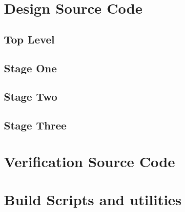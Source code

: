     \section{Design Source Code}
        \subsection{Top Level}
        
        
        \subsection{Stage One}
        
        
        
        
        
        
        
        \subsection{Stage Two}
        
        
        
        
        
        
        
        
        
        
        \subsection{Stage Three}
        
        
        
        
        

    \section{Verification Source Code}
        
        
        
        
    
    \section{Build Scripts and utilities}
        
        
        

